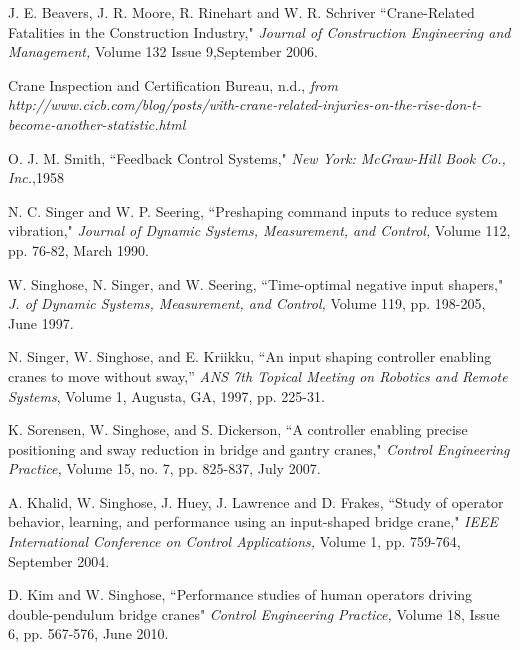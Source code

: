 \documentclass[twocolumn,10pt]{asme2e}
\begin{document}

\begin{thebibliography}{9}

J. E. Beavers, J. R. Moore, R. Rinehart and W. R. Schriver
``Crane-Related Fatalities in the Construction Industry,"
{\em Journal of Construction Engineering and Management,}
 Volume 132 Issue 9,September 2006.

Crane Inspection and Certification Bureau, n.d., 
{\em from http://www.cicb.com/blog/posts/with-crane-related-injuries-on-the-rise-don-t-become-another-statistic.html}

O. J. M. Smith,
``Feedback Control Systems,"
{\em New York: McGraw-Hill Book Co., Inc.},1958

N. C. Singer and W. P. Seering,
``Preshaping command inputs to reduce system vibration,"
{\em Journal of Dynamic Systems, Measurement, and Control,}
Volume 112, pp. 76-82, March 1990.

 
 W. Singhose, N. Singer, and W. Seering,
 ``Time-optimal negative input shapers,"
 {\em J. of Dynamic Systems, Measurement, and Control,}
Volume 119, pp. 198-205, June 1997.
 
N. Singer, W. Singhose, and E. Kriikku,
``An input shaping controller enabling cranes to move without sway,''
{\em ANS 7th Topical Meeting on Robotics and Remote Systems}, 
Volume 1, Augusta, GA, 1997, pp. 225-31. 

K. Sorensen, W. Singhose, and S. Dickerson,
``A controller enabling
precise positioning and sway reduction in bridge and gantry cranes,"
{\em Control Engineering Practice,}
 Volume 15, no. 7, pp. 825-837, July 2007.

A. Khalid, W. Singhose, J. Huey, J. Lawrence and D. Frakes,
``Study of operator behavior, learning, and performance using an input-shaped bridge crane,"
{\em IEEE International Conference on Control Applications,}
 Volume 1, pp. 759-764, September 2004.
 
 D. Kim and W. Singhose,
``Performance studies of human operators driving double-pendulum bridge cranes"
{\em Control Engineering Practice,}
Volume 18, Issue 6, pp. 567-576, June 2010. 
 

\end{thebibliography}
\end{document}

